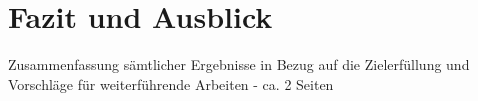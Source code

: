 \chapter{Fazit und Ausblick}
\thispagestyle{fancy}

Zusammenfassung sämtlicher Ergebnisse in Bezug auf die Zielerfüllung und Vorschläge für weiterführende Arbeiten - ca. 2 Seiten

